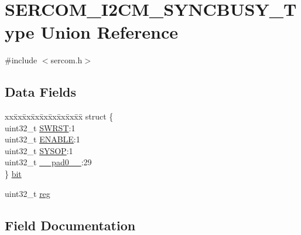 \hypertarget{union_s_e_r_c_o_m___i2_c_m___s_y_n_c_b_u_s_y___type}{}\section{S\+E\+R\+C\+O\+M\+\_\+\+I2\+C\+M\+\_\+\+S\+Y\+N\+C\+B\+U\+S\+Y\+\_\+\+Type Union Reference}
\label{union_s_e_r_c_o_m___i2_c_m___s_y_n_c_b_u_s_y___type}


{\ttfamily \#include $<$sercom.\+h$>$}

\subsection*{Data Fields}
\begin{DoxyCompactItemize}
\item 
\begin{tabbing}
xx\=xx\=xx\=xx\=xx\=xx\=xx\=xx\=xx\=\kill
struct \{\\
\>uint32\_t \mbox{\hyperlink{union_s_e_r_c_o_m___i2_c_m___s_y_n_c_b_u_s_y___type_a34cd956a8da179cbd5fc9060306d420e}{SWRST}}:1\\
\>uint32\_t \mbox{\hyperlink{union_s_e_r_c_o_m___i2_c_m___s_y_n_c_b_u_s_y___type_a66f979832c85e0692bd9422b05aff1f7}{ENABLE}}:1\\
\>uint32\_t \mbox{\hyperlink{union_s_e_r_c_o_m___i2_c_m___s_y_n_c_b_u_s_y___type_a8fa543cb284ecc42c48daa582579f57e}{SYSOP}}:1\\
\>uint32\_t \mbox{\hyperlink{union_s_e_r_c_o_m___i2_c_m___s_y_n_c_b_u_s_y___type_a3e57c2ef1c3ffb36722f000cc1156824}{\_\_pad0\_\_}}:29\\
\} \mbox{\hyperlink{union_s_e_r_c_o_m___i2_c_m___s_y_n_c_b_u_s_y___type_af2577b89a0db2572b62408c3f56f3f08}{bit}}\\

\end{tabbing}\item 
uint32\+\_\+t \mbox{\hyperlink{union_s_e_r_c_o_m___i2_c_m___s_y_n_c_b_u_s_y___type_a6b91636401516a477989a336376d7b40}{reg}}
\end{DoxyCompactItemize}


\subsection{Field Documentation}
\mbox{\label{union_s_e_r_c_o_m___i2_c_m___s_y_n_c_b_u_s_y___type_a3e57c2ef1c3ffb36722f000cc1156824}} 
